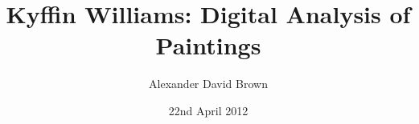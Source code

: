 
\title{Kyffin Williams: Digital Analysis of Paintings}

\author{Alexander David Brown}




\date{22nd April 2012} %

\mmpversion{\version}



\maketitle



